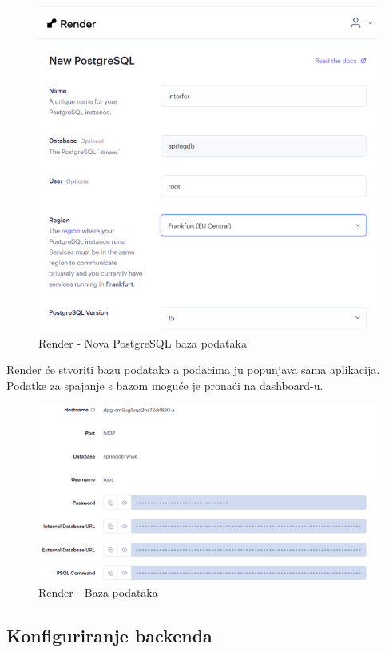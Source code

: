 \begin{figure}[H]
	\includegraphics[scale=0.4]{slike/render_db.png}
	\centering
	\caption{Render - Nova PostgreSQL baza podataka}
	\label{fig:render_db1}
\end{figure}

Render će stvoriti bazu podataka a podacima ju popunjava sama aplikacija. 
Podatke za spajanje s bazom moguće je pronaći na dashboard-u.

\begin{figure}[H]
	\includegraphics[scale=0.4]{slike/render_db1.png}
	\centering
	\caption{Render - Baza podataka}
	\label{fig:render_db2}
\end{figure}

\subsection{Konfiguriranje backenda}

